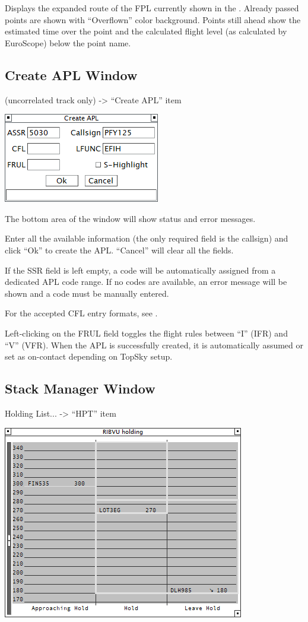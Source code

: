 \documentclass[11pt,a4paper]{memoir}
\begin{document}
Displays the expanded route of the FPL currently shown in the \textit{}. Already passed points are shown with “Overflown” color background. Points still ahead show the estimated time over the point and the calculated flight level (as calculated by EuroScope) below the point name.

\subsection{Create APL Window}
\label{win:apl}

\textit{} (uncorrelated track only) -> “Create APL” item

\includegraphics{img/apl2.png}

The bottom area of the window will show status and error messages.

Enter all the available information (the only required field is the callsign) and click “Ok” to create the APL. “Cancel” will clear all the fields.

If the SSR field is left empty, a code will be automatically assigned from a dedicated APL code range. If no codes are available, an error message will be shown and a code must be manually entered.

For the accepted CFL entry formats, see \textit{}.

Left-clicking on the FRUL field toggles the flight rules between “I” (IFR) and “V” (VFR).
When the APL is successfully created, it is automatically assumed or set as on-contact depending on TopSky setup.

\subsection{Stack Manager Window}
\label{win:smw}
Holding List... -> “HPT” item

\includegraphics{img/stackman.png}
\end{document}
